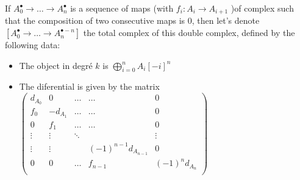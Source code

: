 %

\begin{definition}\label{def:total_complex}
    If $A_0^{\bullet}\to\ldots \to A_n^{\bullet}$ is a sequence of maps (with $f_i:A_i\to A_{i+1}$ )of complex such that the composition of two consecutive maps is $0$, then let's denote $[A_0^{\bullet}\to\ldots \to A_n^{\bullet-n}]$ the total complex of this double complex, defined by the following data:\begin{itemize}
        \item The object in degré $k$ is $\bigoplus\limits_{i=0}^nA_i[-i]^n$
        \item The diferential is given by the matrix $\begin{pmatrix}
            d_{A_0} & 0 & \ldots & \ldots & 0\\
            f_0 & -d_{A_1} & \ldots & \ldots & 0\\
            0 & f_1 & \ldots & \ldots & 0\\
            \vdots & \vdots & \ddots &  & \vdots\\
            \vdots & \vdots & & (-1)^{n-1}d_{A_{n-1}} & 0\\
            0 & 0 & \ldots & f_{n-1} & (-1)^nd_{A_n}\\
            \end{pmatrix}$
    \end{itemize}
\end{definition}

